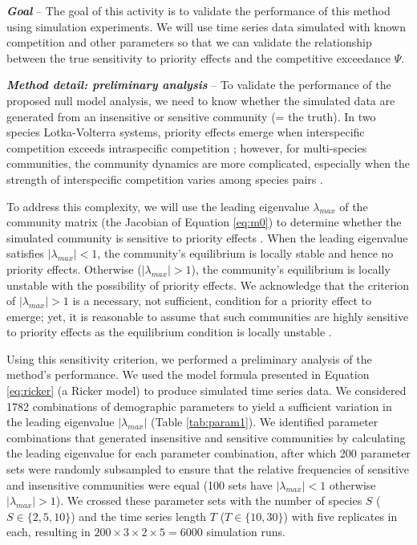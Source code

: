 \documentclass[12pt, class=article, crop=false]{standalone}
\begin{document}
\textbf{\textit{Goal}} -- 
The goal of this activity is to validate the performance of this method using simulation experiments.
We will use time series data simulated with known competition and other parameters so that we can validate the relationship between the true sensitivity to priority effects and the competitive exceedance $\Psi$.

\textbf{\textit{Method detail: preliminary analysis}} -- 
To validate the performance of the proposed null model analysis, we need to know whether the simulated data are generated from an insensitive or sensitive community (= the truth).
In two species Lotka-Volterra systems, priority effects emerge when interspecific competition exceeds intraspecific competition \citep{ke_coexistence_2018}; however, for multi-species communities, the community dynamics are more complicated, especially when the strength of interspecific competition varies among species pairs \citep{carroll_niche_2011, barabas_chessons_2018}.

To address this complexity, we will use the leading eigenvalue $\lambda_{max}$ of the community matrix (the Jacobian of Equation \ref{eq:m0}) to determine whether the simulated community is sensitive to priority effects \citep{otto_biologists_2011}.
When the leading eigenvalue satisfies $|\lambda_{max}| < 1$, the community's equilibrium is locally stable and hence no priority effects.
Otherwise ($|\lambda_{max}| > 1$), the community's equilibrium is locally unstable with the possibility of priority effects.
We acknowledge that the criterion of $|\lambda_{max}| > 1$ is a necessary, not sufficient, condition for a priority effect to emerge; yet, it is reasonable to assume that such communities are highly sensitive to priority effects as the equilibrium condition is locally unstable  \citep{otto_biologists_2011}. 

Using this sensitivity criterion, we performed a preliminary analysis of the method's performance.
We used the model formula presented in Equation \ref{eq:ricker} (a Ricker model) to produce simulated time series data.
We considered 1782 combinations of demographic parameters to yield a sufficient variation in the leading eigenvalue $|\lambda_{max}|$ (Table \ref{tab:param1}).
We identified parameter combinations that generated insensitive and sensitive communities by calculating the leading eigenvalue for each parameter combination, after which 200 parameter sets were randomly subsampled to ensure that the relative frequencies of sensitive and insensitive communities were equal (100 sets have $|\lambda_{max}| < 1$ otherwise $|\lambda_{max}| > 1$).
We crossed these parameter sets with the number of species $S$ ($S \in \{2, 5, 10\}$) and the time series length $T$ ($T \in \{10, 30\}$) with five replicates in each, resulting in $200 \times 3 \times 2 \times 5 = 6000$ simulation runs.
\end{document}
